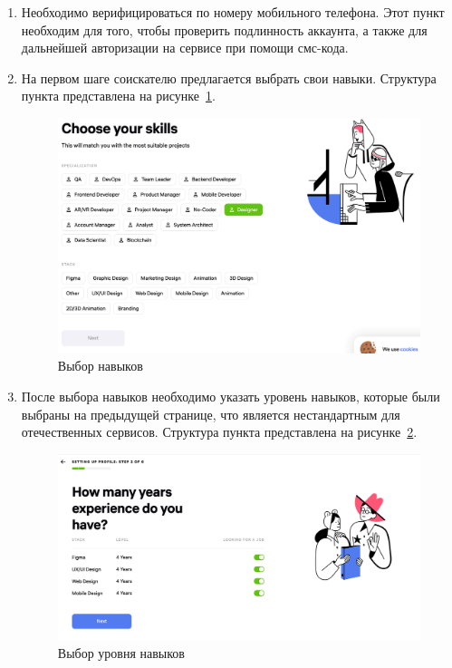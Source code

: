 \documentclass[master, och, diploma]{SCWorks}
\begin{document}
\begin{enumerate}
    \item Необходимо верифицироваться по номеру мобильного телефона. Этот пункт необходим для того, чтобы проверить подлинность аккаунта, а также для дальнейшей авторизации на сервисе при помощи смс-кода.
    \item На первом шаге соискателю предлагается выбрать свои навыки. Структура пункта представлена на рисунке~\ref{fig:10}.
        \begin{figure}[!ht]
            \centering
            \includegraphics[width=12cm]{images/image10.png}
            \caption{\label{fig:10}%
                Выбор навыков}
        \end{figure}
    \item После выбора навыков необходимо указать уровень навыков, которые были выбраны на предыдущей странице, что является нестандартным для отечественных сервисов. Структура пункта представлена на рисунке~\ref{fig:11}.
    \begin{figure}[!ht]
        \centering
        \includegraphics[width=12cm]{images/image11.png}
        \caption{\label{fig:11}%
            Выбор уровня навыков}
    \end{figure}


\end{enumerate}
\end{document}
